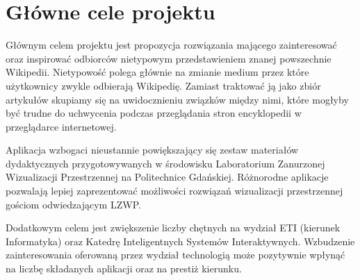\section{Główne cele projektu}
Głównym celem projektu jest propozycja rozwiązania mającego zainteresować oraz inspirować odbiorców nietypowym przedstawieniem znanej powszechnie Wikipedii. Nietypowość polega głównie na zmianie medium przez które użytkownicy zwykle odbierają Wikipedię. Zamiast traktować ją jako zbiór artykułów skupiamy się na uwidocznieniu związków między nimi, które mogłyby być trudne do uchwycenia podczas przeglądania stron encyklopedii w przeglądarce internetowej.

Aplikacja wzbogaci nieustannie powiększający się zestaw materiałów dydaktycznych przygotowywanych w środowisku Laboratorium Zanurzonej Wizualizacji Przestrzennej na Politechnice Gdańskiej. Różnorodne aplikacje pozwalają lepiej zaprezentować możliwości rozwiązań wizualizacji przestrzennej gościom odwiedzającym LZWP.

Dodatkowym celem jest zwiększenie liczby chętnych na wydział ETI (kierunek Informatyka) oraz Katedrę Inteligentnych Systemów Interaktywnych. Wzbudzenie zainteresowania oferowaną przez wydział technologią może pozytywnie wpłynąć na liczbę składanych aplikacji oraz na prestiż kierunku.
